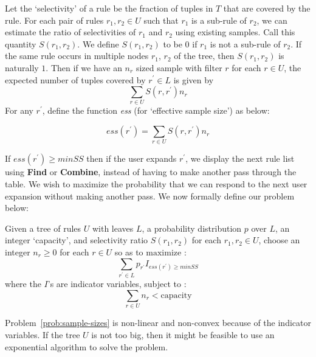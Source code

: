Let the `selectivity' of a rule be the fraction of tuples in $T$ that are covered by the rule. For each pair of rules $r_1, r_2 \in U$ such that $r_1$ is a sub-rule of $r_2$, we can estimate the ratio of selectivities of $r_1$ and $r_2$ using existing samples. Call this quantity $S(r_1, r_2)$. We define $S(r_1, r_2)$ to be $0$ if $r_1$ is not a sub-rule of $r_2$. If the same rule occurs in multiple nodes $r_1$, $r_2$ of the tree, then $S(r_1, r_2)$ is naturally $1$. Then if we have an $n_r$ sized sample with filter $r$ for each $r \in U$, the expected number of tuples covered by $r^{\prime} \in L$ is given by $$\sum_{r \in U} S(r, r^{\prime})n_r$$ For any $r^{\prime}$, define the function {\em ess} (for `effective sample size') as below: 
\begin{definition}\label{def:ess}
$$ess(r^{\prime}) = \sum_{r \in U} S(r, r^{\prime})n_r$$ 
\end{definition}
If $ess(r^{\prime}) \geq minSS$ then if the user expands $r^{\prime}$, we display the next rule list using \textbf{Find} or \textbf{Combine}, instead of having to make another pass through the table. We wish to maximize the probability that we can respond to the next user expansion without making another pass. We now formally define our problem below:
\begin{problem}\label{prob:sample-sizes}
Given a tree of rules $U$ with leaves $L$, a probability distribution $p$ over $L$, an integer `capacity', and selectivity ratio $S(r_1, r_2)$ for each $r_1, r_2 \in U$, 
choose an integer $n_r \geq 0$ for each $r \in U$ so as to $\textrm{maximize}$ :
$$\sum_{r^{\prime} \in L} p_{r^{\prime}}I_{ess(r^{\prime}) \geq minSS}$$
where the $I$'s are indicator variables, subject to :
$$\sum_{r \in U} n_r < \text{capacity}$$
\end{problem}
Problem~\ref{prob:sample-sizes} is non-linear and non-convex because of the indicator variables. If the tree $U$ is not too big, then it might be feasible to use an exponential algorithm to solve the problem. 

